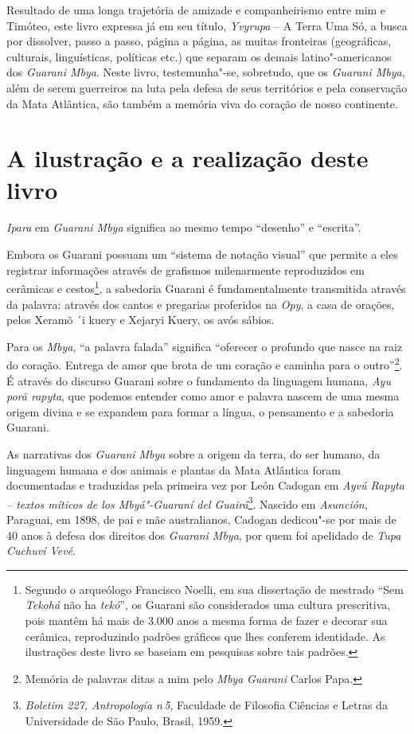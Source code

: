 Resultado de uma longa trajetória de amizade e companheirismo entre mim
e Timóteo, este livro expressa já em seu
título, \emph{{Yvyrupa}} {-- A Terra Uma Só}, a busca por
dissolver, passo a passo, página a página, as muitas fronteiras
(geográficas, culturais, linguísticas, políticas etc.) que separam os
demais latino"-americanos dos \emph{Guarani Mbya}. Neste livro,
testemunha"-se, sobretudo, que os \emph{Guarani Mbya}, além de serem
guerreiros na luta pela defesa de seus territórios e pela conservação da
Mata Atlântica, são também a memória viva do coração de nosso
continente.

 

 

\section{A ilustração e a realização deste livro}

\emph{Ipara} em \emph{Guarani Mbya} significa ao mesmo tempo ``desenho''
e ``escrita''.

Embora os Guarani possuam um ``sistema de notação visual'' que permite a
eles registrar informações através de grafismos milenarmente
reproduzidos em cerâmicas e cestos\footnote{ Segundo o arqueólogo Francisco Noelli, em sua dissertação de mestrado
``Sem \emph{Tekohá} não ha \emph{tekó}'', os Guarani são considerados
uma cultura prescritiva, pois mantêm há mais de 3.000 anos a mesma forma
de fazer e decorar sua cerâmica, reproduzindo padrões gráficos que lhes
conferem identidade. As ilustrações deste livro se baseiam em pesquisas
sobre tais padrões.},
a sabedoria Guarani é fundamentalmente transmitida através da palavra:
através dos cantos e pregarias proferidos na \emph{Opy}, a casa de
orações, pelos Xeramõ ´i kuery e Xejaryi Kuery, os avós sábios.

Para os \emph{Mbya}, ``a palavra falada'' significa ``oferecer o
profundo que nasce na raiz do coração. Entrega de amor que brota de um
coração e caminha para o outro''\footnote{ Memória de palavras ditas a mim pelo \emph{Mbya} \emph{Guarani} Carlos
Papa.}. É através do discurso Guarani sobre o fundamento da linguagem humana,
\emph{Ayu porã rapyta}, que podemos entender como amor e palavra nascem
de uma mesma origem divina e se expandem para formar a língua, o
pensamento e a sabedoria Guarani.

As narrativas dos \emph{Guarani Mbya} sobre a origem da terra, do ser
humano, da linguagem humana e dos animais e plantas da Mata Atlântica
foram documentadas e traduzidas pela primeira vez por León Cadogan em
\emph{Ayvú Rapyta -- textos míticos de los Mbyá"-Guaraní del
Guairá}\footnote{ \emph{Boletim 227, Antropología n\,5}, Faculdade de Filosofia Ciências e
Letras da Universidade de São Paulo, Brasil, 1959.}. Nascido em
\emph{Asunción}, Paraguai, em 1898, de pai e mãe australianos, Cadogan
dedicou"-se por mais de 40 anos à defesa dos direitos dos \emph{Guarani
Mbya}, por quem foi apelidado de \emph{Tupa Cuchuví Vevé}.

